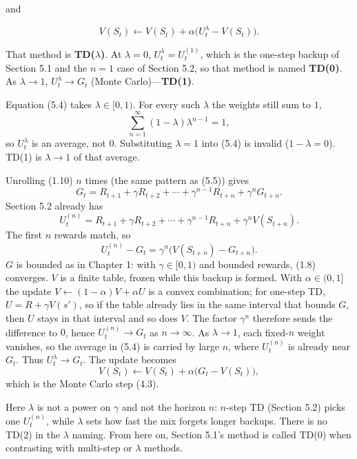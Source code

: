 and

\[
V(S_t)\leftarrow V(S_t)+\alpha\bigl(U_t^{\lambda}-V(S_t)\bigr).
\]

That method is \textbf{TD($\lambda$)}. At $\lambda=0$, $U_t^{\lambda}=U_t^{(1)}$, which is the one-step backup of Section 5.1 and the $n{=}1$ case of Section 5.2, so that method is named \textbf{TD(0)}. As $\lambda\to 1$, $U_t^{\lambda}\to G_t$ (Monte Carlo)---\textbf{TD(1)}.

\begin{asidenote}[Note]
Equation (5.4) takes $\lambda\in[0,1)$. For every such $\lambda$ the weights still sum to $1$,
\[
\sum_{n=1}^{\infty}(1-\lambda)\lambda^{n-1}=1,
\]
so $U_t^{\lambda}$ is an average, not $0$. Substituting $\lambda=1$ into (5.4) is invalid ($1-\lambda=0$). TD(1) is $\lambda\to 1$ of that average.

Unrolling (1.10) $n$ times (the same pattern as (5.5)) gives
\[
G_t=R_{t+1}+\gamma R_{t+2}+\cdots+\gamma^{n-1}R_{t+n}+\gamma^n G_{t+n}.
\]
Section 5.2 already has
\[
U_t^{(n)}=R_{t+1}+\gamma R_{t+2}+\cdots+\gamma^{n-1}R_{t+n}+\gamma^n V(S_{t+n}).
\]
The first $n$ rewards match, so
\[
U_t^{(n)}-G_t=\gamma^n\bigl(V(S_{t+n})-G_{t+n}\bigr).
\]
$G$ is bounded as in Chapter 1: with $\gamma\in[0,1)$ and bounded rewards, (1.8) converges. $V$ is a finite table, frozen while this backup is formed. With $\alpha\in(0,1]$ the update $V\leftarrow(1-\alpha)V+\alpha U$ is a convex combination; for one-step TD, $U=R+\gamma V(s')$, so if the table already lies in the same interval that bounds $G$, then $U$ stays in that interval and so does $V$. The factor $\gamma^n$ therefore sends the difference to $0$, hence $U_t^{(n)}\to G_t$ as $n\to\infty$. As $\lambda\to 1$, each fixed-$n$ weight vanishes, so the average in (5.4) is carried by large $n$, where $U_t^{(n)}$ is already near $G_t$. Thus $U_t^{\lambda}\to G_t$. The update becomes
\[
V(S_t)\leftarrow V(S_t)+\alpha\bigl(G_t-V(S_t)\bigr),
\]
which is the Monte Carlo step (4.3).
\end{asidenote}

Here $\lambda$ is not a power on $\gamma$ and not the horizon $n$: $n$-step TD (Section 5.2) picks one $U_t^{(n)}$, while $\lambda$ sets how fast the mix forgets longer backups. There is no TD(2) in the $\lambda$ naming. From here on, Section 5.1's method is called TD(0) when contrasting with multi-step or $\lambda$ methods.

